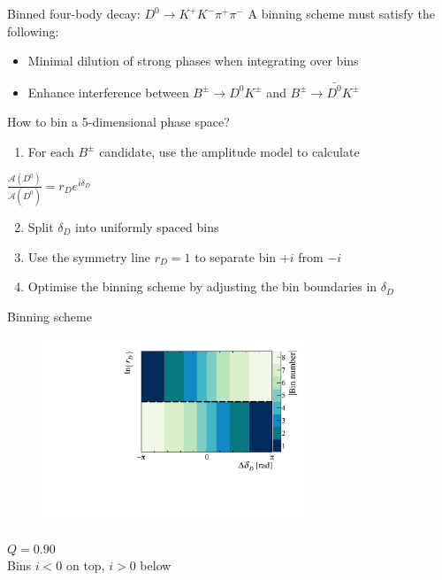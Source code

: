 \documentclass[dvipsnames]{beamer}
\begin{document}
\begin{frame}{Binned four-body decay: $D^0\to K^+K^-\pi^+\pi^-$}
  \vspace{0.0cm}
  {\Large A binning scheme must satisfy the following:}
  \begin{itemize}
    \item{Minimal dilution of strong phases when integrating over bins}
    \item{Enhance interference between $B^\pm\to D^0K^\pm$ and $B^\pm\to\bar{D^0}K^\pm$}
  \end{itemize}
  \vspace{0.4cm}
  {\Large How to bin a 5-dimensional phase space?}
  \begin{enumerate}
    \item{For each $B^\pm$ candidate, use the amplitude model to calculate}
  \end{enumerate}
  \begin{center}
    {\Large $\frac{\mathcal{A}(D^0)}{\mathcal{A}(\bar{D^0})} = r_De^{i\delta_D}$}
  \end{center}
  \begin{enumerate}
    \setcounter{enumi}{1}
    \setlength\itemsep{0.5em}
    \item{Split $\delta_D$ into uniformly spaced bins}
    \item{Use the symmetry line $r_D = 1$ to separate bin $+i$ from $-i$}
    \item{Optimise the binning scheme by adjusting the bin boundaries in $\delta_D$}
  \end{enumerate}
\end{frame}

\begin{frame}{Binning scheme}
  \begin{figure}
    \centering
    \includegraphics[width = 0.7\textwidth]{Plots/BinningSchemePlot_8Bins.pdf}
  \end{figure}
  \vspace{-1.0cm}
  \begin{center}
    $Q = 0.90$ \\
    Bins $i < 0$ on top, $i > 0$ below
  \end{center}
\end{frame}
\end{document}
